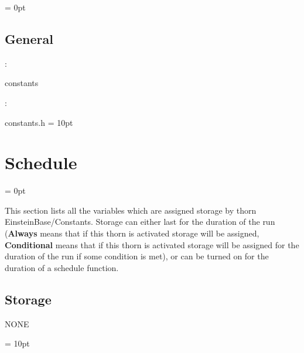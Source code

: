 \documentclass{article}
\begin{document}
\parskip = 0pt

\vspace{3mm} \subsection*{General}

: 

constants
\vspace{2mm}

\vspace{5mm}

: 



constants.h
\vspace{2mm}\parskip = 10pt 

\section{Schedule} 


\parskip = 0pt


\noindent This section lists all the variables which are assigned storage by thorn EinsteinBase/Constants.  Storage can either last for the duration of the run ({\bf Always} means that if this thorn is activated storage will be assigned, {\bf Conditional} means that if this thorn is activated storage will be assigned for the duration of the run if some condition is met), or can be turned on for the duration of a schedule function.


\subsection*{Storage}NONE

\vspace{5mm}\parskip = 10pt 
\end{document}
